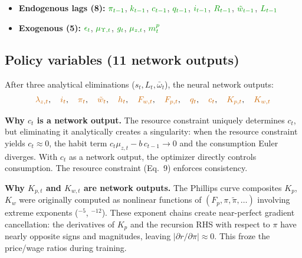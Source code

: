 \documentclass[11pt]{article}
\begin{document}
\begin{itemize}
\item \textbf{Endogenous lags (8):}\;
  $\textcolor{green!60!black}{\pi_{t-1}}$,\;
  $\textcolor{green!60!black}{k_{t-1}}$,\;
  $\textcolor{green!60!black}{c_{t-1}}$,\;
  $\textcolor{green!60!black}{q_{t-1}}$,\;
  $\textcolor{green!60!black}{i_{t-1}}$,\;
  $\textcolor{green!60!black}{R_{t-1}}$,\;
  $\textcolor{green!60!black}{\tilde{w}_{t-1}}$,\;
  $\textcolor{green!60!black}{L_{t-1}}$

\item \textbf{Exogenous (5):}\;
  $\textcolor{green!60!black}{\epsilon_t}$,\;
  $\textcolor{green!60!black}{\mu_{\Upsilon,t}}$,\;
  $\textcolor{green!60!black}{g_t}$,\;
  $\textcolor{green!60!black}{\mu_{z,t}}$,\;
  $\textcolor{green!60!black}{m_t^p}$
\end{itemize}

\subsection{Policy variables (11 network outputs)}

After three analytical eliminations ($s_t, L_t, \bar\omega_t$), the neural
network outputs:
\[
  \textcolor{orange!80!black}{\lambda_{z,t}},\quad
  \textcolor{orange!80!black}{i_t},\quad
  \textcolor{orange!80!black}{\pi_t},\quad
  \textcolor{orange!80!black}{\tilde{w}_t},\quad
  \textcolor{orange!80!black}{h_t},\quad
  \textcolor{orange!80!black}{F_{w,t}},\quad
  \textcolor{orange!80!black}{F_{p,t}},\quad
  \textcolor{orange!80!black}{q_t},\quad
  \textcolor{orange!80!black}{c_t},\quad
  \textcolor{orange!80!black}{K_{p,t}},\quad
  \textcolor{orange!80!black}{K_{w,t}}
\]

\noindent\textbf{Why $c_t$ is a network output.}\;
The resource constraint uniquely determines $c_t$, but eliminating it
analytically creates a singularity: when the resource constraint yields
$c_t \approx 0$, the habit term $c_t\mu_{z,t} - b\,c_{t-1} \to 0$ and
the consumption Euler diverges. With $c_t$ as a network output, the optimizer
directly controls consumption. The resource constraint (Eq.~9) enforces
consistency.

\medskip\noindent\textbf{Why $K_{p,t}$ and $K_{w,t}$ are network outputs.}\;
The Phillips curve composites $K_p$, $K_w$ were originally computed as
nonlinear functions of $(F_p, \pi, \tilde\pi, \ldots)$ involving extreme
exponents (${}^{-5}$, ${}^{-12}$). These exponent chains create near-perfect
gradient cancellation: the derivatives of $K_p$ and the recursion RHS with
respect to $\pi$ have nearly opposite signs and magnitudes, leaving
$|\partial r/\partial \pi| \approx 0$. This froze the price/wage ratios
during training.
\end{document}
